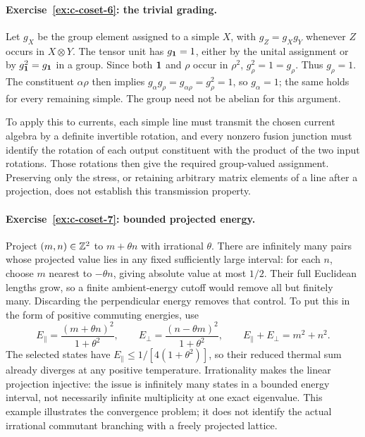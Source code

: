 \paragraph{Exercise~\ref{ex:c-coset-6}: the trivial grading.}
\label{sol:ex:c-coset-6}
Let $g_X$ be the group element assigned to a simple $X$, with
$g_Z=g_Xg_Y$ whenever $Z$ occurs in $X\otimes Y$.
The tensor unit has $g_{\mathbf1}=1$, either by the unital assignment
or by $g_{\mathbf1}^2=g_{\mathbf1}$ in a group.
Since both $\mathbf1$ and $\rho$ occur in $\rho^2$,
$g_\rho^2=1=g_\rho$. Thus $g_\rho=1$.
The constituent $\alpha\rho$ then implies
$g_\alpha g_\rho=g_{\alpha\rho}=g_\rho^2=1$,
so $g_\alpha=1$; the same holds for every remaining simple.
The group need not be abelian for this argument.

To apply this to currents, each simple line must transmit the
chosen current algebra by a definite invertible rotation, and
every nonzero fusion junction must identify the rotation of
each output constituent with the product of the two input
rotations. Those rotations then give the required group-valued
assignment. Preserving only the stress, or retaining arbitrary
matrix elements of a line after a projection, does not establish
this transmission property.



\paragraph{Exercise~\ref{ex:c-coset-7}: bounded projected energy.}
\label{sol:ex:c-coset-7}
Project $(m,n)\in\mathbb Z^2$ to $m+\theta n$ with irrational $\theta$.
There are infinitely many pairs whose projected value lies in any
fixed sufficiently large interval: for each $n$, choose $m$ nearest
to $-\theta n$, giving absolute value at most $1/2$. Their full
Euclidean lengths grow, so a finite ambient-energy cutoff would
remove all but finitely many. Discarding the perpendicular energy
removes that control. To put this in the form of positive commuting
energies, use
\[
 E_{\parallel}=\frac{(m+\theta n)^2}{1+\theta^2},\qquad
 E_{\perp}=\frac{(n-\theta m)^2}{1+\theta^2},\qquad
 E_{\parallel}+E_{\perp}=m^2+n^2.
\]
The selected states have $E_{\parallel}\leq1/[4(1+\theta^2)]$,
so their reduced thermal sum already diverges at any positive
temperature. Irrationality makes the linear projection injective:
the issue is infinitely many states in a bounded energy interval,
not necessarily infinite multiplicity at one exact eigenvalue.
This example illustrates the convergence
problem; it does not identify the actual irrational commutant
branching with a freely projected lattice.



